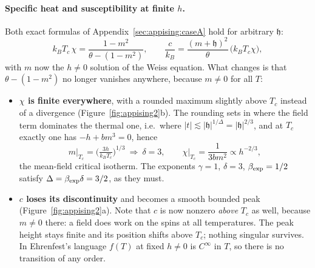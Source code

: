 \documentclass[10pt,a4paper]{article}
\theoremstyle{remark}
\begin{document}
\paragraph{Specific heat and susceptibility at finite $h$.} Both exact formulas of
Appendix~\ref{sec:appising:caseA} hold for arbitrary $\mathfrak{h}$:
\[
k_BT_c\,\chi=\frac{1-m^{2}}{\theta-(1-m^{2})},
\qquad
\frac{c}{k_B}=\frac{(m+\mathfrak{h})^{2}}{\theta}\,\big(k_BT_c\chi\big),
\]
with $m$ now the $h\neq0$ solution of the Weiss equation. What changes is that
$\theta-(1-m^{2})$ no longer vanishes anywhere, because $m\neq0$ for all $T$:
\begin{itemize}
\item \textbf{$\chi$ is finite everywhere}, with a rounded maximum slightly above
$T_c$ instead of a divergence (Figure~\ref{fig:appising2}b). The rounding sets in
where the field term dominates the thermal one, i.e.\ where $|t|\lesssim
|\mathfrak{h}|^{1/\Delta}=|\mathfrak{h}|^{2/3}$, and at $T_c$ exactly one has
$-h+bm^{3}=0$, hence
\[
m\big|_{T_c}=\Big(\tfrac{3h}{k_BT_c}\Big)^{1/3}
\ \Rightarrow\ \delta=3,
\qquad
\chi\big|_{T_c}=\frac{1}{3bm^{2}}\propto h^{-2/3} ,
\]
the mean-field critical isotherm. The exponents $\gamma=1$, $\delta=3$,
$\beta_{\rm exp}=1/2$ satisfy $\Delta=\beta_{\rm exp}\delta=3/2$, as they must.
\item \textbf{$c$ loses its discontinuity} and becomes a smooth bounded peak
(Figure~\ref{fig:appising2}a). Note that $c$ is now nonzero \emph{above} $T_c$ as
well, because $m\neq0$ there: a field does work on the spins at all
temperatures. The peak height stays finite and its position shifts above $T_c$;
nothing singular survives. In Ehrenfest's language $f(T)$ at fixed $h\neq0$ is
$C^{\infty}$ in $T$, so there is no transition of any order.
\end{itemize}
\end{document}
